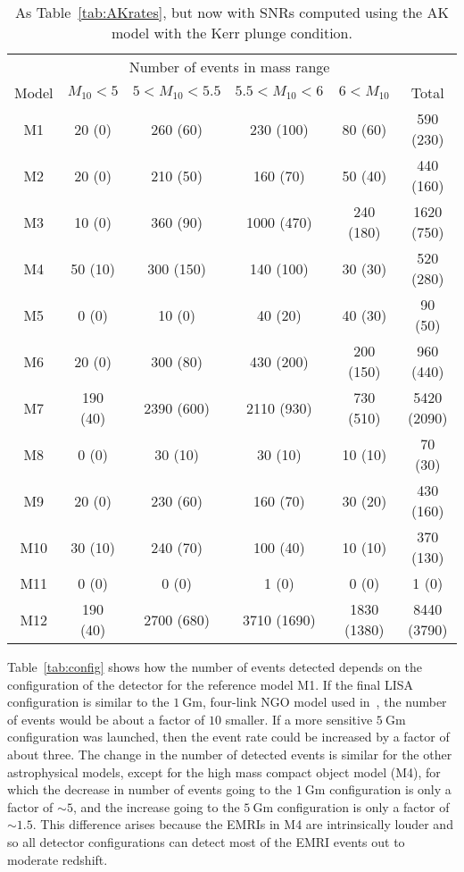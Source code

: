 \documentclass[a4paper]{jpconf}
\begin{document}
\begin{table}
\begin{center}
\begin{tabular}{c|c|c|c|c|c|}
&\multicolumn{4}{|c|}{Number of events in mass range}&\\
Model&$M_{10}< 5$&$5 < M_{10} < 5.5$&$5.5 < M_{10} < 6$&$6 < M_{10}$&Total\\\hline
M1&20 (0)&260 (60)&230 (100)&80 (60)&590 (230)\\
M2&20 (0)&210 (50)&160 (70)&50 (40)&440 (160)\\
M3&10 (0)&360 (90)&1000 (470)&240 (180)&1620 (750)\\
M4&50 (10)&300 (150)&140 (100)&30 (30)&520 (280)\\
M5&0 (0)&10 (0)&40 (20)&40 (30)&90 (50)\\
M6&20 (0)&300 (80)&430 (200)&200 (150)&960 (440)\\
M7&190 (40)&2390 (600)&2110 (930)&730 (510)&5420 (2090)\\
M8&0 (0)&30 (10)&30 (10)&10 (10)&70 (30)\\
M9&20 (0)&230 (60)&160 (70)&30 (20)&430 (160)\\
M10&30 (10)&240 (70)&100 (40)&10 (10)&370 (130)\\
M11&0 (0)&0 (0)&1 (0)&0 (0)&1 (0)\\
M12&190 (40)&2700 (680)&3710 (1690)&1830 (1380)&8440 (3790)\\
\end{tabular}
\end{center}
\caption{\label{tab:NKrates}As Table~\ref{tab:AKrates}, but now with SNRs computed using the AK model with the Kerr plunge condition.}
\end{table}

Table~\ref{tab:config} shows how the number of events detected depends on the configuration of the detector for the reference model M1. If the final LISA configuration is similar to the $1~\mathrm{Gm}$, four-link NGO model used in~\cite{tgu}, the number of events would be about a factor of $10$ smaller. If a more sensitive $5~\mathrm{Gm}$ configuration was launched, then the event rate could be increased by a factor of about three. The change in the number of detected events is similar for the other astrophysical models, except for the high mass compact object model (M4), for which the decrease in number of events going to the $1~\mathrm{Gm}$ configuration is only a factor of $\sim5$, and the increase going to the $5~\mathrm{Gm}$ configuration is only a factor of $\sim1.5$. This difference arises because the EMRIs in M4 are intrinsically louder and so all detector configurations can detect most of the EMRI events out to moderate redshift.
\end{document}
